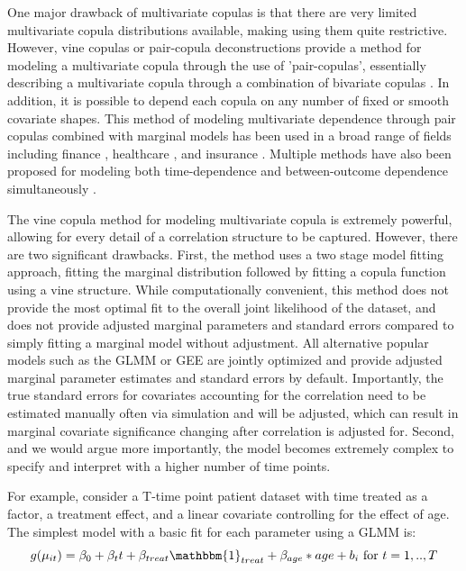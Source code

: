 \documentclass{article}
\begin{document}
One major drawback of multivariate copulas is that there are very limited multivariate copula distributions available, making using them quite restrictive. However, vine copulas or pair-copula deconstructions provide a method for modeling a multivariate copula through the use of 'pair-copulas', essentially describing a multivariate copula through a combination of bivariate copulas \citep{czado_vine_2022,aas_pair-copula_2009,smith_modeling_2010}. In addition, it is possible to depend each copula on any number of fixed or smooth covariate shapes\citep{vatternagler2018}. This method of modeling multivariate dependence through pair copulas combined with marginal models has been used in a broad range of fields including finance \citep{domma_statistical_2009}, healthcare \citep{sun_heavy-tailed_2008,lambert_copula}, and insurance \citep{frees_credibility_2005}. Multiple methods have also been proposed for modeling both time-dependence and between-outcome dependence simultaneously \citep{smith_copula_2015,czado2015,Beareseo2015}. 

The vine copula method for modeling multivariate copula is extremely powerful, allowing for every detail of a correlation structure to be captured. However, there are two significant drawbacks. First, the method uses a two stage model fitting approach, fitting the marginal distribution followed by fitting a copula function using a vine structure. While computationally convenient, this method does not provide the most optimal fit to the overall joint likelihood of the dataset, and does not provide adjusted marginal parameters and standard errors compared to simply fitting a marginal model without adjustment. All alternative popular models such as the GLMM or GEE are jointly optimized and provide adjusted marginal parameter estimates and standard errors by default. Importantly, the true standard errors for covariates accounting for the correlation need to be estimated manually often via simulation and will be adjusted, which can result in marginal covariate significance changing after correlation is adjusted for. Second, and we would argue more importantly, the model becomes extremely complex to specify and interpret with a higher number of time points. 

For example, consider a T-time point patient dataset with time treated as a factor, a treatment effect, and a linear covariate controlling for the effect of age. The simplest model with a basic fit for each parameter using a GLMM is:
$$g(\mu_{it})=\beta_0 + \beta_t t+\beta_{treat}\mathbbm{1}_{treat}+\beta_{age}*age +b_i \text{ for } t=1,..,T$$
\end{document}
